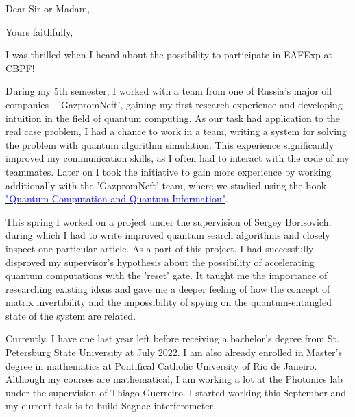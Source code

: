 \documentclass[11pt,a4paper,sans]{moderncv}        %
\begin{document}
	\clearpage
	\date{Sep 29, 2022}
	\opening{Dear Sir or Madam,}
	\closing{Yours faithfully,}
	\makelettertitle
	
	I was thrilled when I heard about the possibility to participate in EAFExp at CBPF!
	
	During my 5th semester, I worked with a team from one of Russia's major oil companies - 'GazpromNeft', gaining my first research experience and developing intuition in the field of quantum computing. As our task had application to the real case problem, I had a chance to work in a team, writing a system for solving the problem with quantum algorithm simulation. This experience significantly improved my communication skills, as I often had to interact with the code of my teammates. Later on I took the initiative to gain more experience by working additionally with the 'GazpromNeft' team, where we studied using the book \href{https://www.cambridge.org/ru/academic/subjects/physics/quantum-physics-quantum-information-and-quantum-computation/quantum-computation-and-quantum-information-10th-anniversary-edition?format=HB&isbn=9781107002173}{\textcolor{blue}{"Quantum Computation and Quantum Information"}}.
	
	This spring I worked on a project under the supervision of Sergey Borisovich, during which I had to write improved quantum search algorithms and closely inspect one particular article. As a part of this project, I had successfully disproved my supervisor's hypothesis about the possibility of accelerating quantum computations with the 'reset' gate. It taught me the importance of researching existing ideas and gave me a deeper feeling of how the concept of matrix invertibility and the impossibility of spying on the quantum-entangled state of the system are related.
	
	Currently, I have one last year left before receiving a bachelor's degree from St. Petersburg State University at July 2022. I am also already enrolled in Master's degree in mathematics at Pontifical Catholic University of Rio de Janeiro. Although my courses are mathematical, I am working a lot at the Photonics lab under the supervision of Thiago Guerreiro. I started working this September and my current task is to build Sagnac interferometer.
	
\end{document}
